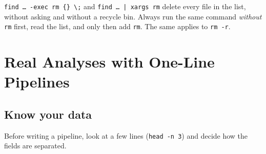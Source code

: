 \documentclass[11pt,a4paper]{article}
\newcommand{\cmd}[1]{\texttt{#1}}
\begin{document}
\begin{tryit}
\cmd{find \dots{} -exec rm \{\} \textbackslash;} and \cmd{find \dots{} | xargs rm} delete every file in the list, without asking and without a recycle bin. Always run the same command \emph{without} \cmd{rm} first, read the list, and only then add \cmd{rm}. The same applies to \cmd{rm -r}.
\end{tryit}

\section{Real Analyses with One-Line Pipelines}
\label{sec:analysis}

\subsection{Know your data}

Before writing a pipeline, look at a few lines (\cmd{head -n 3}) and decide how the fields are separated.
\end{document}
